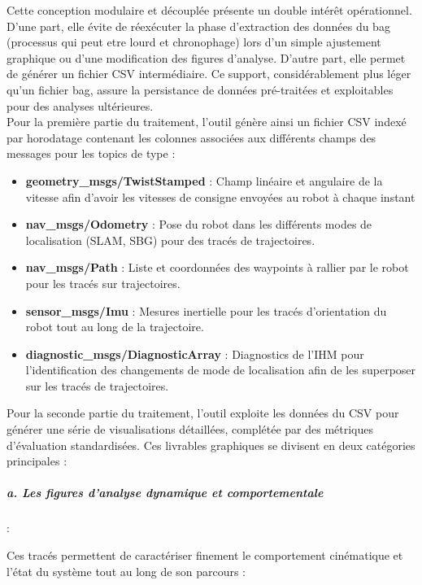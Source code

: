 \indent Cette conception modulaire et découplée présente un double intérêt opérationnel. D'une part, elle évite de réexécuter la phase d'extraction des données du bag (processus qui peut etre lourd et chronophage) lors d'un simple ajustement graphique ou d'une modification des figures d'analyse. D'autre part, elle permet de générer un fichier CSV intermédiaire. Ce support, considérablement plus léger qu'un fichier bag, assure la persistance de données pré-traitées et exploitables pour des analyses ultérieures.\\

\indent Pour la première partie du traitement, l'outil génère ainsi un fichier CSV indexé par horodatage contenant les colonnes associées aux différents champs des messages pour les topics de type :\\

\begin{itemize}
\renewcommand{\labelitemi}{$\bullet$}
    \item \textbf{geometry\_msgs/TwistStamped} : Champ linéaire et angulaire de la vitesse afin d'avoir les vitesses de consigne envoyées au robot à chaque instant
    \item \textbf{nav\_msgs/Odometry} : Pose du robot dans les différents modes de localisation (SLAM, SBG) pour des tracés de trajectoires.
    \item \textbf{nav\_msgs/Path} : Liste et coordonnées des waypoints à rallier par le robot pour les tracés sur trajectoires.
    \item \textbf{sensor\_msgs/Imu} : Mesures inertielle pour les tracés d'orientation du robot tout au long de la trajectoire.
    \item \textbf{diagnostic\_msgs/DiagnosticArray} : Diagnostics de l'IHM pour l'identification des changements de mode de localisation afin de les superposer sur les tracés de trajectoires.\\ 
\end{itemize} 

\indent Pour la seconde partie du traitement, l'outil exploite les données du CSV pour générer une série de visualisations détaillées, complétée par des métriques d'évaluation standardisées. Ces livrables graphiques se divisent en deux catégories principales :

\subparagraph{a. Les figures d'analyse dynamique et comportementale}:

Ces tracés permettent de caractériser finement le comportement cinématique et l'état du système tout au long de son parcours : \\

